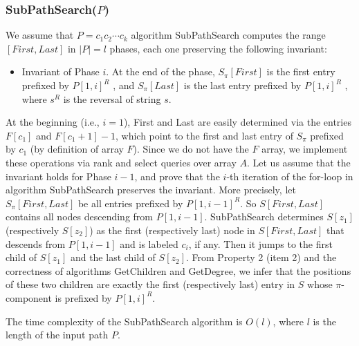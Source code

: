 \subsubsection*{SubPathSearch($P$)}
We assume that $P = c_1c_2 \cdots c_k$ algorithm SubPathSearch computes the range $[First, Last]$ in $|P| = l$ phases, each one preserving the following invariant:

\begin{itemize}
    \item Invariant of Phase $i$. At the end of the phase, $S_{\pi}[First]$ is the first entry prefixed by $P[1, i]^R$ , and $S_{\pi}[Last]$ is the last entry prefixed by $P[1, i]^R$ , where $s^R$ is the reversal of string $s$.
\end{itemize}

At the beginning (i.e., $i = 1$), First and Last are easily determined via the entries $F[c_1]$ and $F[c_1 + 1] - 1$, which point to the first and last entry of $S_{\pi}$ prefixed by $c_1$ (by definition of array $F$). Since we do not have the $F$ array, we implement these operations via rank and select queries over array $A$. Let us assume that the invariant holds for Phase $i - 1$, and prove that the $i$-th iteration of the for-loop in algorithm SubPathSearch preserves the invariant. More precisely, let $S_{\pi}[First, Last]$ be all entries prefixed by $P[1, i - 1]^R$. So $S[First, Last]$ contains all nodes descending from $P[1, i - 1]$. SubPathSearch determines $S[z_1]$ (respectively $S[z_2]$) as the first (respectively last) node in $S[First, Last]$ that descends from $P[1, i - 1]$ and is labeled $c_i$, if any. Then it jumps to the first child of $S[z_1]$ and the last child of $S[z_2]$. From Property 2 (item 2) and the correctness of algorithms GetChildren and GetDegree, we infer that the positions of these two children are exactly the first (respectively last) entry in $S$ whose $\pi$-component is prefixed by $P[1, i]^R$. 

The time complexity of the SubPathSearch algorithm is $O(l)$, where $l$ is the length of the input path $P$.

